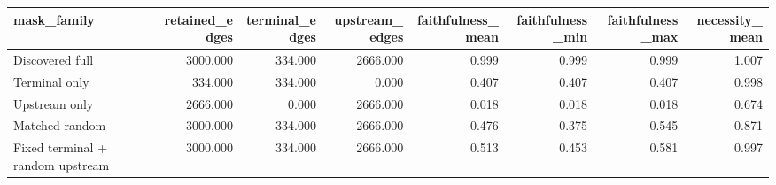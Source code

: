 \begin{tabular}{lrrrrrrr}
\toprule
mask\_family & retained\_edges & terminal\_edges & upstream\_edges & faithfulness\_mean & faithfulness\_min & faithfulness\_max & necessity\_mean \\
\midrule
Discovered full & 3000.000 & 334.000 & 2666.000 & 0.999 & 0.999 & 0.999 & 1.007 \\
Terminal only & 334.000 & 334.000 & 0.000 & 0.407 & 0.407 & 0.407 & 0.998 \\
Upstream only & 2666.000 & 0.000 & 2666.000 & 0.018 & 0.018 & 0.018 & 0.674 \\
Matched random & 3000.000 & 334.000 & 2666.000 & 0.476 & 0.375 & 0.545 & 0.871 \\
Fixed terminal + random upstream & 3000.000 & 334.000 & 2666.000 & 0.513 & 0.453 & 0.581 & 0.997 \\
\bottomrule
\end{tabular}
